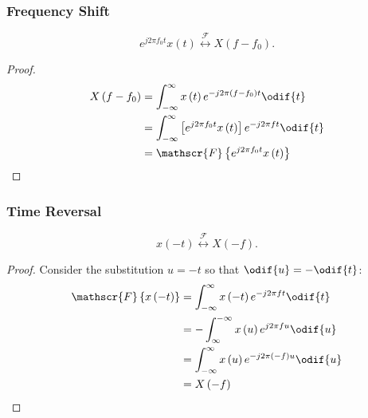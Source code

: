 \documentclass{article}
\begin{document}
\subsubsection{Frequency Shift}
\begin{equation*}
    e^{j 2\pi f_0 t} x\left( t \right) \overset{\mathscr{F}}{\longleftrightarrow} X\left( f - f_0 \right).
\end{equation*}
\begin{proof}
    \begin{align*}
        X\left( f - f_0 \right) & = \int_{-\infty}^\infty x\left( t \right) e^{-j 2\pi \left( f - f_0 \right) t} \odif{t}            \\
                                & = \int_{-\infty}^\infty \left[ e^{j 2\pi f_0 t} x\left( t \right) \right] e^{-j 2\pi f t} \odif{t} \\
                                & = \mathscr{F}\left\{ e^{j 2\pi f_0 t} x\left( t \right) \right\}
    \end{align*}
\end{proof}
\subsubsection{Time Reversal}
\begin{equation*}
    x\left( -t \right) \overset{\mathscr{F}}{\longleftrightarrow} X\left( -f \right).
\end{equation*}
\begin{proof}
    Consider the substitution \(u = -t\) so that \(\odif{u} = -\odif{t}\):
    \begin{align*}
        \mathscr{F}\left\{ x\left( -t \right) \right\} & = \int_{-\infty}^\infty x\left( -t \right) e^{-j 2\pi f t} \odif{t}                \\
                                                       & = -\int_\infty^{-\infty} x\left( u \right) e^{j 2\pi f u} \odif{u}                 \\
                                                       & = \int_{-\infty}^\infty x\left( u \right) e^{-j 2\pi \left( -f \right) u} \odif{u} \\
                                                       & = X\left( -f \right)
    \end{align*}
\end{proof}
\end{document}
